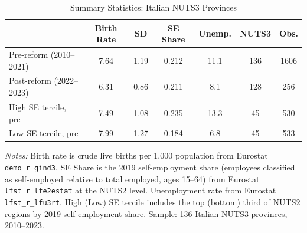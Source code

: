 \begin{table}[t]
\centering
\caption{Summary Statistics: Italian NUTS3 Provinces}
\label{tab:sumstats}
\small
\begin{tabular}{lcccccc}
\toprule
& Birth Rate & SD & SE Share & Unemp. & NUTS3 & Obs. \\
\midrule
Pre-reform (2010--2021) & 7.64 & 1.19 & 0.212 & 11.1 & 136 & 1606 \\
Post-reform (2022--2023) & 6.31 & 0.86 & 0.211 & 8.1 & 128 & 256 \\
High SE tercile, pre & 7.49 & 1.08 & 0.235 & 13.3 & 45 & 530 \\
Low SE tercile, pre & 7.99 & 1.27 & 0.184 & 6.8 & 45 & 533 \\
\bottomrule
\end{tabular}
\par\vspace{0.3em}\begin{flushleft}\small
\textit{Notes:} Birth rate is crude live births per 1,000 population from Eurostat \texttt{demo\_r\_gind3}. SE Share is the 2019 self-employment share (employees classified as self-employed relative to total employed, ages 15--64) from Eurostat \texttt{lfst\_r\_lfe2estat} at the NUTS2 level. Unemployment rate from Eurostat \texttt{lfst\_r\_lfu3rt}. High (Low) SE tercile includes the top (bottom) third of NUTS2 regions by 2019 self-employment share. Sample: 136 Italian NUTS3 provinces, 2010--2023.
\end{flushleft}
\end{table}
